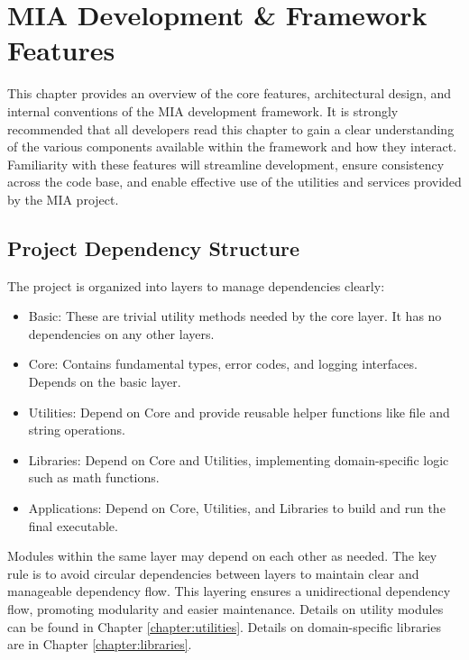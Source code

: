 \chapter{MIA Development \& Framework Features}
\pagestyle{fancy}

This chapter provides an overview of the core features, architectural design, and internal conventions of the MIA development framework. It is strongly recommended that all developers read this chapter to gain a clear understanding of the various components available within the framework and how they interact. Familiarity with these features will streamline development, ensure consistency across the code base, and enable effective use of the utilities and services provided by the MIA project.




\section{Project Dependency Structure}
\label{section:dependancy_structure}

The project is organized into layers to manage dependencies clearly:
\begin{itemize}\itemsep0em
	\item Basic: These are trivial utility methods needed by the core layer. It has no dependencies on any other layers.
	\item Core: Contains fundamental types, error codes, and logging interfaces. Depends on the basic layer.
	\item Utilities: Depend on Core and provide reusable helper functions like file and string operations.
	\item Libraries: Depend on Core and Utilities, implementing domain-specific logic such as math functions.
	\item Applications: Depend on Core, Utilities, and Libraries to build and run the final executable.
\end{itemize}
Modules within the same layer may depend on each other as needed. The key rule is to avoid circular dependencies between layers to maintain clear and manageable dependency flow. This layering ensures a unidirectional dependency flow, promoting modularity and easier maintenance. Details on utility modules can be found in Chapter \ref{chapter:utilities}. Details on domain-specific libraries are in Chapter \ref{chapter:libraries}.







